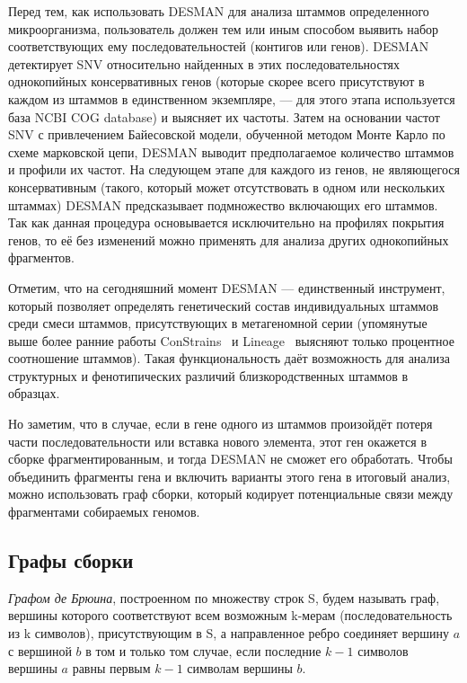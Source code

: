 \documentclass{spbau-diploma}
\begin{document}
 
Перед тем, как использовать DESMAN для анализа штаммов определенного микроорганизма, пользователь должен тем или иным способом выявить набор соответствующих ему последовательностей (контигов или генов).
DESMAN детектирует SNV относительно найденных в этих последовательностях однокопийных консервативных генов (которые скорее всего присутствуют в каждом из штаммов в единственном экземпляре, --- для этого этапа используется база NCBI COG database) и выясняет их частоты. 
Затем на основании частот SNV с привлечением Байесовской модели, обученной методом Монте Карло по схеме марковской цепи, DESMAN выводит предполагаемое количество штаммов и профили их частот. На следующем этапе для каждого из генов, не являющегося консервативным (такого, который может отсутствовать в одном или нескольких штаммах) DESMAN предсказывает подмножество включающих его штаммов. Так как данная процедура основывается исключительно на профилях покрытия генов, то её без изменений можно применять для анализа других однокопийных фрагментов. 

Отметим, что на сегодняшний момент DESMAN --- единственный инструмент, который позволяет определять генетический состав индивидуальных штаммов среди смеси штаммов, присутствующих в метагеномной серии (упомянутые выше более ранние работы ConStrains~\cite{Constrains} и Lineage~\cite{Lineage} выясняют только процентное соотношение штаммов). Такая функциональность даёт возможность для анализа структурных и фенотипических различий близкородственных штаммов в образцах.

Но заметим, что в случае, если в гене одного из штаммов произойдёт потеря части последовательности или вставка нового элемента, этот ген окажется в сборке фрагментированным, и тогда DESMAN не сможет его обработать. Чтобы объединить фрагменты гена и включить варианты этого гена в итоговый анализ, можно использовать граф сборки, который кодирует потенциальные связи между фрагментами собираемых геномов.



\subsection{Графы сборки}

\textit{Графом де Брюина}, построенном по множеству строк S, будем называть граф, вершины которого соответствуют всем возможным k-мерам (последовательность из k символов), присутствующим в S, а направленное ребро соединяет вершину $a$ с вершиной $b$ в том и только том случае, если последние $k - 1$ символов вершины $a$ равны первым $k - 1$ символам вершины $b$.
\end{document}
